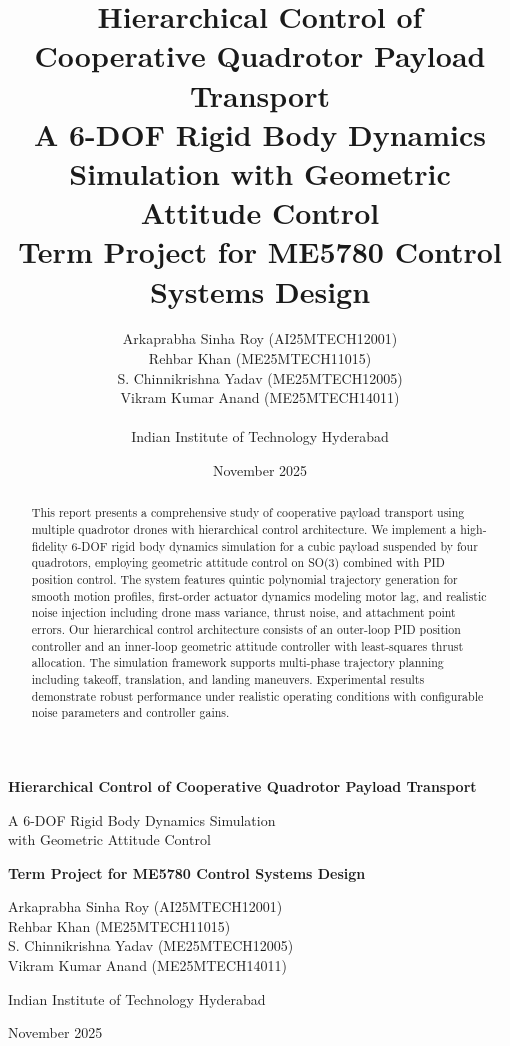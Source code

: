 \documentclass[12pt,a4paper]{article}
\title{\textbf{Hierarchical Control of Cooperative Quadrotor Payload Transport}\\
\Large A 6-DOF Rigid Body Dynamics Simulation with Geometric Attitude Control\\
\vspace{0.5cm}
\normalsize \textbf{Term Project for ME5780 Control Systems Design}}
\author{
    Arkaprabha Sinha Roy (AI25MTECH12001) \\
    Rehbar Khan (ME25MTECH11015) \\
    S. Chinnikrishna Yadav (ME25MTECH12005) \\
    Vikram Kumar Anand (ME25MTECH14011)\\
    \vspace{0.5cm}\\
    Indian Institute of Technology Hyderabad
}
\date{November 2025}
\begin{document}
\begin{titlepage}
\centering
\vspace*{2cm}

{\LARGE\bfseries Hierarchical Control of Cooperative Quadrotor Payload Transport\par}
\vspace{1cm}
{\Large A 6-DOF Rigid Body Dynamics Simulation\\ with Geometric Attitude Control\par}
\vspace{1.5cm}
{\large\bfseries Term Project for ME5780 Control Systems Design\par}
\vspace{2cm}

{\large
Arkaprabha Sinha Roy (AI25MTECH12001)\\
Rehbar Khan (ME25MTECH11015)\\
S. Chinnikrishna Yadav (ME25MTECH12005)\\
Vikram Kumar Anand (ME25MTECH14011)\par}
\vspace{2cm}

{\large Indian Institute of Technology Hyderabad\par}
\vspace{1cm}
{\large November 2025\par}

\vfill

\end{titlepage}

\begin{abstract}
This report presents a comprehensive study of cooperative payload transport using multiple quadrotor drones with hierarchical control architecture. We implement a high-fidelity 6-DOF rigid body dynamics simulation for a cubic payload suspended by four quadrotors, employing geometric attitude control on SO(3) combined with PID position control. The system features quintic polynomial trajectory generation for smooth motion profiles, first-order actuator dynamics modeling motor lag, and realistic noise injection including drone mass variance, thrust noise, and attachment point errors. Our hierarchical control architecture consists of an outer-loop PID position controller and an inner-loop geometric attitude controller with least-squares thrust allocation. The simulation framework supports multi-phase trajectory planning including takeoff, translation, and landing maneuvers. Experimental results demonstrate robust performance under realistic operating conditions with configurable noise parameters and controller gains.
\end{abstract}
\end{document}
